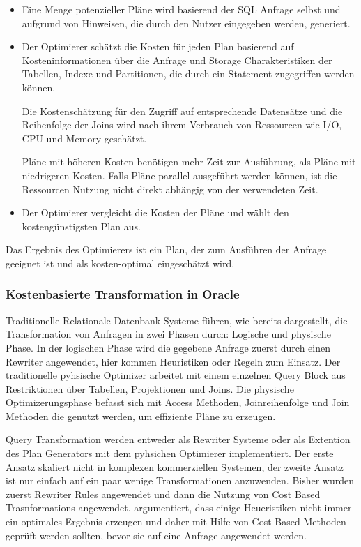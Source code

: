 \begin{itemize}
\item Eine Menge potenzieller Pläne wird basierend der SQL Anfrage selbst und aufgrund von Hinweisen, die durch den Nutzer eingegeben werden, generiert.

\item Der Optimierer schätzt die Kosten für jeden Plan basierend auf Kosteninformationen über die Anfrage und Storage Charakteristiken der Tabellen, Indexe und Partitionen, die durch ein Statement zugegriffen werden können.

Die Kostenschätzung für den Zugriff auf entsprechende Datensätze und die Reihenfolge der Joins wird nach ihrem Verbrauch von Ressourcen wie I/O, CPU und Memory geschätzt.

Pläne mit höheren Kosten benötigen mehr Zeit zur Ausführung, als Pläne mit niedrigeren Kosten. Falls Pläne parallel ausgeführt werden können, ist die Ressourcen Nutzung nicht direkt abhängig von der verwendeten Zeit.

\item Der Optimierer vergleicht die Kosten der Pläne und wählt den kostengünstigsten Plan aus.
\end{itemize}

Das Ergebnis des Optimierers ist ein Plan, der zum Ausführen der Anfrage geeignet ist und als kosten-optimal eingeschätzt wird.


\subsubsection{Kostenbasierte Transformation in Oracle}

Traditionelle Relationale Datenbank Systeme führen, wie bereits dargestellt, die Transformation von Anfragen in zwei Phasen durch: Logische und physische Phase. In der logischen Phase wird die gegebene Anfrage zuerst durch einen Rewriter angewendet, hier kommen Heuristiken oder Regeln zum Einsatz. Der traditionelle pyhsische Optimizer arbeitet mit einem einzelnen Query Block aus Restriktionen über Tabellen, Projektionen und Joins. Die physische Optimizerungsphase befasst sich mit Access Methoden, Joinreihenfolge und Join Methoden die genutzt werden, um effiziente Pläne zu erzeugen.

Query Transformation werden entweder als Rewriter Systeme oder als Extention des Plan Generators mit dem pyhsichen Optimierer implementiert. Der erste Ansatz skaliert nicht in komplexen kommerziellen Systemen, der zweite Ansatz ist nur einfach auf ein paar wenige Transformationen anzuwenden. 
Bisher wurden zuerst Rewriter Rules angewendet und dann die Nutzung von Cost Based Trasnformations angewendet. \cite{ahmed2006cost} argumentiert, dass einige Heueristiken nicht immer ein optimales Ergebnis erzeugen und daher mit Hilfe von Cost Based Methoden geprüft werden sollten, bevor sie auf eine Anfrage angewendet werden.


